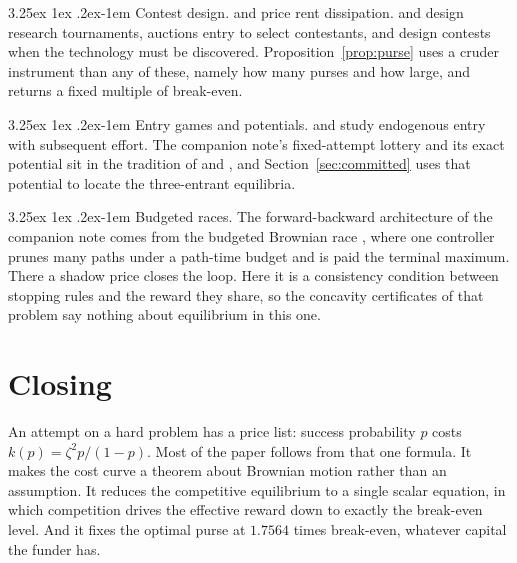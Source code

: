 \documentclass[11pt]{article}
\makeatletter
\renewcommand\paragraph{\@startsection{paragraph}{4}{\z@}%
  {3.25ex \@plus1ex \@minus.2ex}{-1em}%
  {\normalfont\normalsize\itshape}}
\theoremstyle{itheads}
\makeatother
\begin{document}
\paragraph{Contest design.}
\citet{tullock1980} and \citet{baye1996} price rent dissipation.
\citet{taylor1995} and \citet{chegale2003} design research tournaments,
\citet{fullerton1999} auctions entry to select contestants, and
\citet{halac2017} design contests when the technology must be discovered.
Proposition~\ref{prop:purse} uses a cruder instrument than any of these,
namely how many purses and how large, and returns a fixed multiple of
break-even.

\paragraph{Entry games and potentials.}
\citet{morgan2012} and \citet{fujiaolu2015} study endogenous entry with
subsequent effort. The companion note's fixed-attempt lottery and its
exact potential sit in the tradition of \citet{rosenthal1973} and
\citet{monderershapley1996}, and Section~\ref{sec:committed} uses that
potential to locate the three-entrant equilibria.

\paragraph{Budgeted races.}
The forward-backward architecture of the companion note comes from the
budgeted Brownian race \citep{cotton2026wavefront}, where one controller
prunes many paths under a path-time budget and is paid the terminal
maximum. There a shadow price closes the loop. Here it is a consistency
condition between stopping rules and the reward they share, so the
concavity certificates of that problem say nothing about equilibrium in
this one.

\section{Closing}

An attempt on a hard problem has a price list: success probability $p$
costs $k(p)=\zeta^{2}p/(1-p)$. Most of the paper follows from that one
formula. It makes the cost curve a theorem about Brownian motion rather
than an assumption. It reduces the competitive equilibrium to a single
scalar equation, in which competition drives the effective reward down to
exactly the break-even level. And it fixes the optimal purse at $1.7564$
times break-even, whatever capital the funder has.
\end{document}
